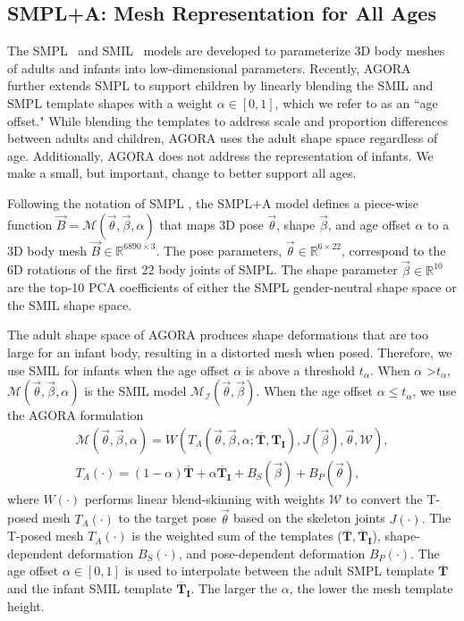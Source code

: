 \documentclass[10pt,twocolumn,letterpaper]{article}
\begin{document}
\subsection{SMPL+A: Mesh Representation for All Ages}

The SMPL~\cite{smpl} and SMIL~\cite{hesse2018learning} models are developed to parameterize 3D body meshes of adults and infants into low-dimensional parameters. Recently, AGORA~\cite{patel2021agora} further extends SMPL to support children by linearly blending the SMIL and SMPL template shapes with a weight $\alpha\in[0,1]$, which we refer to as an ``age offset."
While blending the templates to address scale and proportion differences between adults and children, AGORA uses the adult shape space regardless of age. 
Additionally, AGORA does not address the representation of infants.
We make a small, but important, change to better support all ages.

Following the notation of SMPL \cite{smpl}, the SMPL+A model defines a piece-wise function $\vec{B}=\mathcal{M}(\vec{\theta},\vec{\beta},\alpha)$ that maps 3D pose $ \vec{\theta}$, shape $ \vec{\beta}$, and age offset $\alpha$ to a 3D body mesh $\vec{B}\in\mathbb{R}^{6890 \times 3}$.
The pose parameters, $ \vec{\theta} \in \mathbb{R}^{6 \times 22}$, correspond to the 6D  rotations \cite{Zhou_2019_CVPR} of the first 22 body joints of SMPL.
The shape parameter $\vec{\beta} \in \mathbb{R}^{10}$ are the top-10 PCA coefficients of either the SMPL gender-neutral shape space or the SMIL shape space.

The adult shape space of AGORA produces shape deformations that are too large for an infant body, resulting in a distorted mesh when posed.
Therefore, we use SMIL for infants when the age offset $\alpha$ is above a threshold $t_{\alpha}$.
When $\alpha$ \textgreater $t_{\alpha}$, $\mathcal{M}(\vec{\theta},\vec{\beta},\alpha)$ is the SMIL model $\mathcal{M_I}(\vec{\theta},\vec{\beta})$.
When the age offset $\alpha \leq t_{\alpha}$, we use the AGORA formulation
\begin{equation}
\begin{aligned}
      \mathcal{M}(\vec{\theta},\vec{\beta},\alpha)=W(T_A(\vec{\theta},\vec{\beta},\alpha;\boldsymbol{\overline{T}},\boldsymbol{T_I}), J(\vec{\beta}), \vec{\theta}, \boldsymbol{\mathcal{W}}),\\
      T_A(\cdot)=
   (1-\alpha)\boldsymbol{\overline{T}}+\alpha\boldsymbol{\overline{T}_I}+B_S(\vec{\beta})+B_P(\vec{\theta}),
\end{aligned}
\label{eq:SMPL+A}
\end{equation}
where $W(\cdot)$ performs linear blend-skinning with weights $\boldsymbol{\mathcal{W}}$ to convert the T-posed mesh $T_A(\cdot)$ to the target pose $\vec{\theta}$ based on the skeleton joints $J(\cdot)$.
The T-posed mesh $T_A(\cdot)$ is the weighted sum of the templates ($\boldsymbol{\overline{T}},\boldsymbol{\overline{T}_I}$), shape-dependent deformation $B_S(\cdot)$, and pose-dependent deformation $B_P(\cdot)$. 
The age offset $\alpha \in [0,1]$ is used to interpolate between the adult SMPL template $\boldsymbol{\overline{T}}$ and the infant SMIL template $\boldsymbol{\overline{T}_I}$. 
The larger the $\alpha$, the lower the mesh template height.
\end{document}
